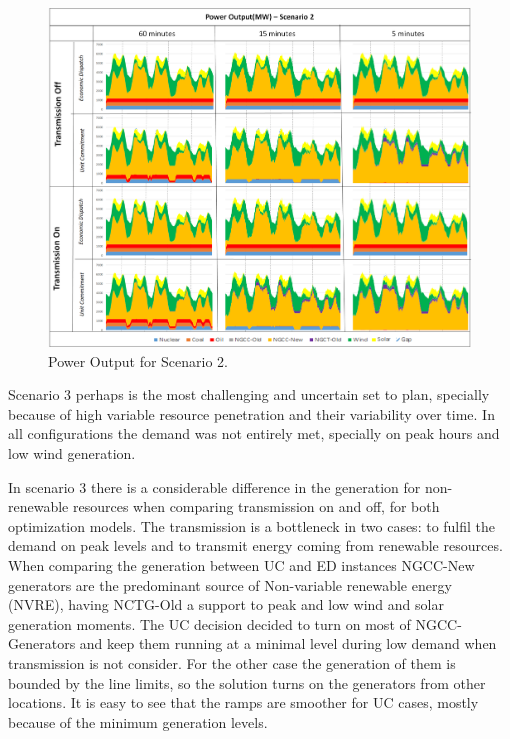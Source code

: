\documentclass[12pt,LUDisStyle,twosided]{book}
\begin{document}
\begin{figure} 
  \centering
  
	  \includegraphics[width=\textwidth,height=\textheight,keepaspectratio]{PowerOutputScenario2.png}
  
  \caption{Power Output for Scenario 2.}
  \label{fig:powerOutputScenario2}
\end{figure}

Scenario 3 perhaps is the most challenging and uncertain set to plan, specially because of high variable resource penetration and their variability over time. In all configurations the demand was not entirely met, specially on peak hours and low wind generation. 

In scenario 3 there is a considerable difference in the generation for non-renewable resources when comparing transmission on and off, for both optimization models. The transmission is a bottleneck in two cases: to fulfil the demand on peak levels and to transmit energy coming from renewable resources. When comparing the generation between UC and ED instances NGCC-New generators are the predominant source of Non-variable renewable energy (NVRE), having NCTG-Old a support to peak and low wind and solar generation moments. The UC decision decided to turn on most of NGCC-Generators and keep them running at a minimal level during low demand when transmission is not consider. For the other case the generation of them is bounded by the line limits, so the solution turns on the generators from other locations. It is easy to see that the ramps are smoother for UC cases, mostly because of the minimum generation levels.
\end{document}
